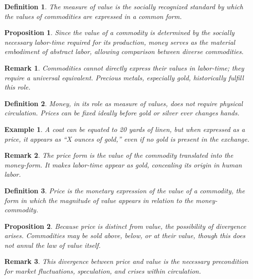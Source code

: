 \documentclass{article}
\newtheorem{innerdef}{Definition}
\newtheorem{innerprop}{Proposition}
\newtheorem{innerex}{Example}
\newtheorem{innerremark}{Remark}
\newenvironment{definition}{\begin{innerdef}}{\end{innerdef}}
\newenvironment{proposition}{\begin{innerprop}}{\end{innerprop}}
\newenvironment{example}{\begin{innerex}}{\end{innerex}}
\newenvironment{remark}{\begin{innerremark}}{\end{innerremark}}
\begin{document}
\begin{definition}
The measure of value is the socially recognized standard by which the values of commodities are expressed in a common form. 
\end{definition}

\begin{proposition}
Since the value of a commodity is determined by the socially necessary labor-time required for its production, money serves as the material embodiment of abstract labor, allowing comparison between diverse commodities.
\end{proposition}

\begin{remark}
Commodities cannot directly express their values in labor-time; they require a universal equivalent. Precious metals, especially gold, historically fulfill this role.
\end{remark}

\begin{definition}
Money, in its role as measure of values, does not require physical circulation. Prices can be fixed ideally before gold or silver ever changes hands.
\end{definition}

\begin{example}
A coat can be equated to 20 yards of linen, but when expressed as a price, it appears as ``X ounces of gold,'' even if no gold is present in the exchange. 
\end{example}

\begin{remark}
The price form is the value of the commodity translated into the money-form. It makes labor-time appear as gold, concealing its origin in human labor.
\end{remark}

\begin{definition}
Price is the monetary expression of the value of a commodity, the form in which the magnitude of value appears in relation to the money-commodity.
\end{definition}

\begin{proposition}
Because price is distinct from value, the possibility of divergence arises. Commodities may be sold above, below, or at their value, though this does not annul the law of value itself.
\end{proposition}

\begin{remark}
This divergence between price and value is the necessary precondition for market fluctuations, speculation, and crises within circulation.
\end{remark}
\end{document}
